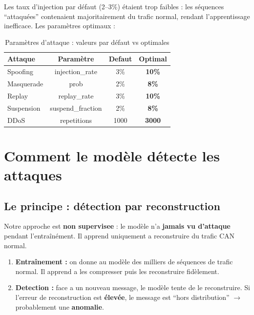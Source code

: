 \documentclass[12pt,a4paper]{article}
\begin{document}
Les taux d'injection par défaut (2--3\%) étaient trop faibles : les séquences ``attaquées'' contenaient majoritairement du trafic normal, rendant l'apprentissage inefficace. Les paramètres optimaux :

\begin{table}[H]
\centering
\begin{tabular}{lccc}
\toprule
\textbf{Attaque} & \textbf{Paramètre} & \textbf{Defaut} & \textbf{Optimal} \\
\midrule
Spoofing & injection\_rate & 3\% & \textbf{10\%} \\
Masquerade & prob & 2\% & \textbf{8\%} \\
Replay & replay\_rate & 3\% & \textbf{10\%} \\
Suspension & suspend\_fraction & 2\% & \textbf{8\%} \\
DDoS & repetitions & 1000 & \textbf{3000} \\
\bottomrule
\end{tabular}
\caption{Paramètres d'attaque : valeurs par défaut vs optimales}
\end{table}

\section{Comment le modèle détecte les attaques}

\subsection{Le principe : détection par reconstruction}

Notre approche est \textbf{non supervisee} : le modèle n'a \textbf{jamais vu d'attaque} pendant l'entraînément. Il apprend uniquement a reconstruire du trafic CAN normal.

\begin{enumerate}
    \item \textbf{Entraînement :} on donne au modèle des milliers de séquences de trafic normal. Il apprend a les compresser puis les reconstruire fidèlement.
    \item \textbf{Detection :} face a un nouveau message, le modèle tente de le reconstruire. Si l'erreur de reconstruction est \textbf{élevée}, le message est ``hors distribution'' $\to$ probablement une \textbf{anomalie}.
\end{enumerate}
\end{document}
